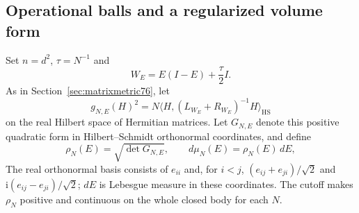 \subsection{Operational balls and a regularized volume form}
Set $n=d^2$, $\tau=N^{-1}$ and
\[
 W_E=E(I-E)+\frac\tau2 I.
\]
As in Section~\ref{sec:matrixmetric76}, let
\begin{equation}\label{eq:matrixfixedform76}
 g_{N,E}(H)^2
 =N\langle H,(L_{W_E}+R_{W_E})^{-1}H\rangle_{\mathrm{HS}}
\end{equation}
on the real Hilbert space of Hermitian matrices. Let $G_{N,E}$ denote
this positive quadratic form in Hilbert--Schmidt orthonormal
coordinates, and define
\begin{equation}\label{eq:matrixmeasure76}
 \rho_N(E)=\sqrt{\det G_{N,E}},\qquad
 d\mu_N(E)=\rho_N(E)\,dE,
\end{equation}
The real orthonormal basis consists of $e_{ii}$ and, for $i<j$,
$(e_{ij}+e_{ji})/\sqrt2$ and $\mathrm i(e_{ij}-e_{ji})/\sqrt2$;
$dE$ is Lebesgue measure in these coordinates. The cutoff makes
$\rho_N$ positive and continuous on the whole closed body for each
$N$.

